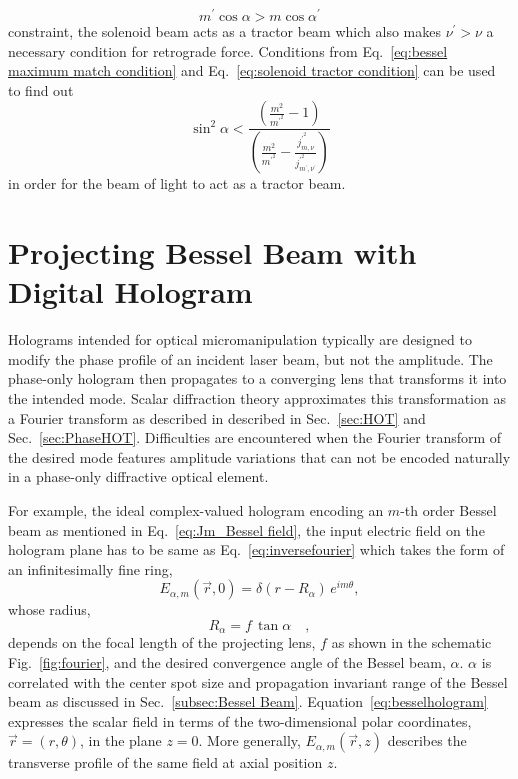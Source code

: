 \begin{equation}
\label{eq:solenoid tractor condition}
m^{\prime}\cos \alpha > m \cos \alpha ^{\prime}
\end{equation}
constraint, the solenoid beam acts as a tractor beam which also makes $\nu^{\prime} > \nu$ a necessary condition for retrograde force. Conditions from Eq.~\eqref{eq:bessel maximum match condition} and Eq.~\eqref{eq:solenoid tractor condition} can be used to find out
\begin{equation}
\label{eq:convergence angle limit}
\sin ^{2} \alpha < \frac{\left(\frac{m^2}{m^{\prime ^{2}}}-1\right)}{\left(\frac{m^2}{m^{\prime ^{2}}} - \frac{j_{m,\nu}^{\prime ^{2}}}{j^{\prime ^{2}}_{m^{\prime},\nu ^{\prime}}}\right)}
\end{equation}
 in order for the beam of light to act as a tractor beam.



\section{Projecting Bessel Beam with \\ Digital Hologram}
\label{sec:Project Bessel Hologram}

Holograms intended for optical micromanipulation typically are designed to modify the phase profile of an incident laser beam, but not the amplitude. The phase-only hologram then propagates to a converging lens that transforms it into the intended mode. Scalar diffraction theory approximates this transformation as a Fourier transform \cite{goodman05} as described in described in Sec.~\ref{sec:HOT} and Sec.~\ref{sec:PhaseHOT}. Difficulties are encountered when the Fourier transform of the desired mode features amplitude variations that can not be encoded naturally in a phase-only diffractive optical element.

For example, the ideal complex-valued hologram encoding 
an $m$-th order Bessel beam as mentioned in Eq.~\eqref{eq:Jm_Bessel field}, the input electric field on the hologram plane has to be same as Eq.~\eqref{eq:inversefourier} which takes the form of an infinitesimally fine ring,
\begin{equation}
  \label{eq:besselhologram}
  E_{\alpha,m}(\vec{r},0)
  =
  \delta(r - R_\alpha) \, e^{i m\theta},
\end{equation}
whose radius, 
\begin{equation}
\label{eq:Ralpha}
R_{\alpha} = f \, \tan \alpha \quad ,
\end{equation}
depends on the focal length of the projecting lens, $f$ as shown in the schematic Fig.~\ref{fig:fourier}, and the desired convergence angle of the Bessel beam, $\alpha$. $\alpha$ is correlated with the center spot size and propagation invariant range of the Bessel beam as discussed in Sec.~\ref{subsec:Bessel Beam}.
Equation~\eqref{eq:besselhologram} expresses the
scalar field in terms of the two-dimensional
polar coordinates, $\vec{r} = (r,\theta)$, in the plane $z = 0$.
More generally, $E_{\alpha,m}(\vec{r},z)$ describes the
transverse profile of the same field at axial position $z$.


